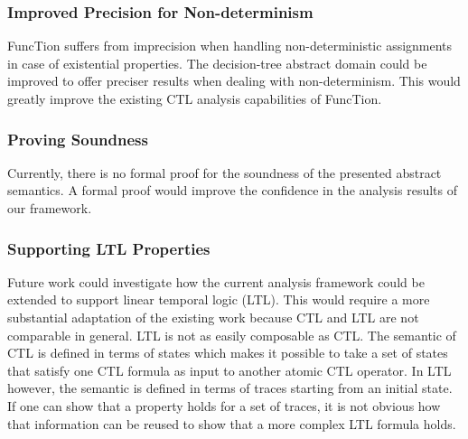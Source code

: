 \documentclass[11pt,a4paper,titlepage]{article}
\theoremstyle{definition}
\begin{document}
\subsubsection*{Improved Precision for Non-determinism}
FuncTion suffers from imprecision when handling non-deterministic assignments in case of existential properties.
The decision-tree abstract domain could be improved to offer preciser results when dealing with non-determinism. 
This would greatly improve the existing CTL analysis capabilities of FuncTion.

\subsubsection*{Proving Soundness}
Currently, there is no formal proof for the soundness of the presented abstract semantics. 
A formal proof would improve the confidence in the analysis results of our framework.

\subsubsection*{Supporting LTL Properties}
Future work could investigate how the current analysis framework could be extended to support linear temporal logic (LTL). 
This would require a more substantial adaptation of the existing work because CTL and LTL are not comparable in general.
LTL is not as easily composable as CTL. The semantic of CTL is defined in terms of states which makes it possible 
to take a set of states that satisfy one CTL formula as input to another atomic CTL operator.
In LTL however, the semantic is defined in terms of traces starting from an initial state. 
If one can show that a property holds for a set of traces, 
it is not obvious how that information can be reused to show that a more complex LTL formula holds.



\pagebreak





\end{document}
